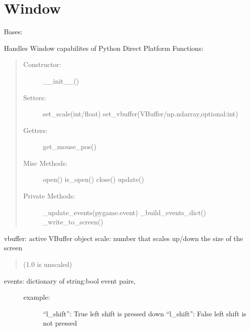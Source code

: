 \documentclass[letterpaper,10pt,english,openany,oneside]{sphinxmanual}
\begin{document}
\section{Window}
\label{\detokenize{dpav:window}}

\begin{fulllineitems}
\sphinxAtStartPar
Bases: 

\sphinxAtStartPar
Handles Window capabilites of Python Direct Platform
Functions:
\begin{quote}
\begin{description}
\item[{Constructor:}] \leavevmode
\sphinxAtStartPar
\_\_init\_\_()

\item[{Setters:}] \leavevmode
\sphinxAtStartPar
set\_scale(int/float)
set\_vbuffer(VBuffer/np.ndarray,optional:int)

\item[{Getters:}] \leavevmode
\sphinxAtStartPar
get\_mouse\_pos()

\item[{Misc Methods:}] \leavevmode
\sphinxAtStartPar
open()
is\_open()
close()
update()

\item[{Private Methods:}] \leavevmode
\sphinxAtStartPar
\_update\_events(pygame.event)
\_build\_events\_dict()
\_write\_to\_screen()

\end{description}
\end{quote}


\begin{fulllineitems}
\sphinxAtStartPar
vbuffer:     active VBuffer object
scale:       number that scales up/down the size of the screen
\begin{quote}

\sphinxAtStartPar
(1.0 is unscaled)
\end{quote}
\begin{description}
\item[{events:      dictionary of string:bool event pairs,}] \leavevmode\begin{description}
\item[{example:}] \leavevmode
\sphinxAtStartPar
“l\_shift”: True  \textendash{} left shift is pressed down
“l\_shift”: False \textendash{} left shift is not pressed


\end{description}
\end{description}
\end{fulllineitems}
\end{fulllineitems}
\end{document}
